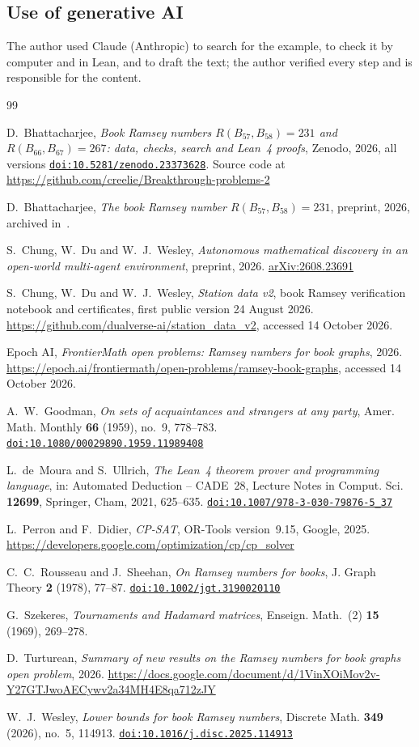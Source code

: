 \documentclass[11pt]{amsart}
\theoremstyle{definition}
\theoremstyle{remark}
\numberwithin{equation}{section}
\newcommand{\doi}[1]{\href{https://doi.org/#1}{\nolinkurl{doi:#1}}}
\begin{document}
\subsection*{Use of generative AI}
The author used Claude (Anthropic) to search for the example, to check it by computer and in Lean, and to draft the text; the author verified every step and is responsible for the content.

\begin{thebibliography}{99}

D.~Bhattacharjee, \emph{Book Ramsey numbers $R(B_{57},B_{58})=231$ and $R(B_{66},B_{67})=267$: data, checks, search and Lean~4 proofs}, Zenodo, 2026, all versions \doi{10.5281/zenodo.23373628}. Source code at \url{https://github.com/creelie/Breakthrough-problems-2}

D.~Bhattacharjee, \emph{The book Ramsey number $R(B_{57},B_{58})=231$}, preprint, 2026, archived in~\cite{Ar}.

S.~Chung, W.~Du and W.~J.~Wesley, \emph{Autonomous mathematical discovery in an open-world multi-agent environment}, preprint, 2026. \href{https://arxiv.org/abs/2608.23691}{arXiv:2608.23691}

S.~Chung, W.~Du and W.~J.~Wesley, \emph{Station data v2}, book Ramsey verification notebook and certificates, first public version 24 August 2026. \url{https://github.com/dualverse-ai/station_data_v2}, accessed 14 October 2026.

Epoch AI, \emph{FrontierMath open problems: Ramsey numbers for book graphs}, 2026. \url{https://epoch.ai/frontiermath/open-problems/ramsey-book-graphs}, accessed 14 October 2026.

A.~W.~Goodman, \emph{On sets of acquaintances and strangers at any party}, Amer. Math. Monthly \textbf{66} (1959), no.~9, 778--783. \doi{10.1080/00029890.1959.11989408}

L.~de~Moura and S.~Ullrich, \emph{The Lean~4 theorem prover and programming language}, in: Automated Deduction -- CADE~28, Lecture Notes in Comput. Sci. \textbf{12699}, Springer, Cham, 2021, 625--635. \doi{10.1007/978-3-030-79876-5_37}

L.~Perron and F.~Didier, \emph{CP-SAT}, OR-Tools version~9.15, Google, 2025. \url{https://developers.google.com/optimization/cp/cp_solver}

C.~C.~Rousseau and J.~Sheehan, \emph{On Ramsey numbers for books}, J. Graph Theory \textbf{2} (1978), 77--87. \doi{10.1002/jgt.3190020110}

G.~Szekeres, \emph{Tournaments and Hadamard matrices}, Enseign. Math.~(2) \textbf{15} (1969), 269--278.

D.~Turturean, \emph{Summary of new results on the Ramsey numbers for book graphs open problem}, 2026. \url{https://docs.google.com/document/d/1VinXOiMov2v-Y27GTJwoAECywv2a34MH4E8qa712zJY}

W.~J.~Wesley, \emph{Lower bounds for book Ramsey numbers}, Discrete Math. \textbf{349} (2026), no.~5, 114913. \doi{10.1016/j.disc.2025.114913}

\end{thebibliography}
\end{document}
